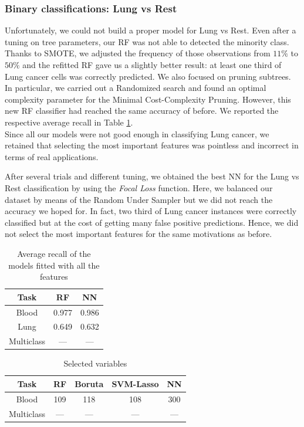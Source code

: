 \documentclass[a4paper,11pt, oneside]{article}  %
\begin{document}
\subsubsection{Binary classifications: Lung vs Rest}
Unfortunately, we could not build a proper model for Lung vs Rest. Even after a tuning on tree parameters, our RF was not able to detected the minority class. Thanks to SMOTE, we adjusted the frequency of those observations from $11\%$ to $50\%$ and the refitted RF gave us a slightly better result: at least one third of Lung cancer cells was correctly predicted. We also focused on pruning subtrees. In particular, we carried out a Randomized search and found an optimal complexity parameter for the Minimal Cost-Complexity Pruning. However, this new RF classifier had reached the same accuracy of before. We reported the respective average recall in Table \ref{table:big_models}. \\
Since all our models were not good enough in classifying Lung cancer, we retained that selecting the most important features was pointless and incorrect in terms of real applications. 

After several trials and different tuning, we obtained the best NN for the Lung vs Rest classification by using the \textit{Focal Loss} function. Here, we balanced our dataset by means of the Random Under Sampler but we did not reach the accuracy we hoped for. In fact, two third of Lung cancer instances were correctly classified but at the cost of getting many false positive predictions. Hence, we did not select the most important features for the same motivations as before. 







\begin{table}[h!]
	\caption{Average recall of the models fitted with all the features}
	\centering
	\begin{tabular}{c c c}
		\hline\hline
		Task & RF & NN \\ [0.5ex] %
		\hline
		Blood & 0.977  & 0.986 \\
		Lung & 0.649  & 0.632 \\
		Multiclass & --- & --- \\ [1ex]
		\hline
	\end{tabular}
	\label{table:big_models}
\end{table}

\begin{table}[h!]
	\caption{Selected variables}
	\centering
	\begin{tabular}{c c c c c}
		\hline\hline
		Task & RF & Boruta & SVM-Lasso & NN \\ [0.5ex] %
		\hline
		Blood & 109 & 118 & 108 & 300 \\
		Multiclass & --- &  --- & --- & --- \\ [1ex]
		\hline
	\end{tabular}
	\label{table:selected variables}
\end{table}
\end{document}
